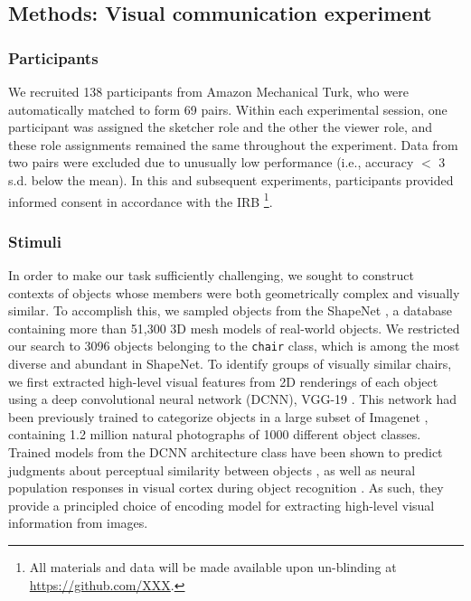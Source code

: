 \documentclass[10pt,letterpaper]{article}
\begin{document}
\subsection{Methods: Visual communication experiment}

\subsubsection{Participants} We recruited 138 participants from Amazon Mechanical Turk, who were automatically matched to form 69 pairs. Within each experimental session, one participant was assigned the sketcher role and the other the viewer role, and these role assignments remained the same throughout the experiment.
Data from two pairs were excluded due to unusually low performance (i.e., accuracy $<$ 3 s.d. below the mean). In this and subsequent experiments, participants provided informed consent in accordance with the IRB%
\footnote{ All materials and data will be made available upon un-blinding at \url{https://github.com/XXX}.}.

\subsubsection{Stimuli}

In order to make our task sufficiently challenging, we sought to construct contexts of objects whose members were both geometrically complex and visually similar.
To accomplish this, we sampled objects from the ShapeNet \cite{chang2015shapenet}, a database containing more than 51,300 3D mesh models of real-world objects. %
We restricted our search to 3096 objects belonging to the \texttt{chair} class, which is among the most diverse and abundant in ShapeNet.
To identify groups of visually similar chairs, we first extracted high-level visual features from 2D renderings of each object using a deep convolutional neural network (DCNN), VGG-19 \cite{simonyan2014very}.
This network had been previously trained to categorize objects in a large subset of Imagenet \cite{deng2009imagenet}, containing 1.2 million natural photographs of 1000 different object classes.
Trained models from the DCNN architecture class have been shown to predict judgments about perceptual similarity between objects \cite{kubilius2016deep,peterson2018evaluating}, as well as neural population responses in visual cortex during object recognition \cite{yamins2014performance,gucclu2015deep}.
As such, they provide a principled choice of encoding model for extracting high-level visual information from images.
\end{document}
